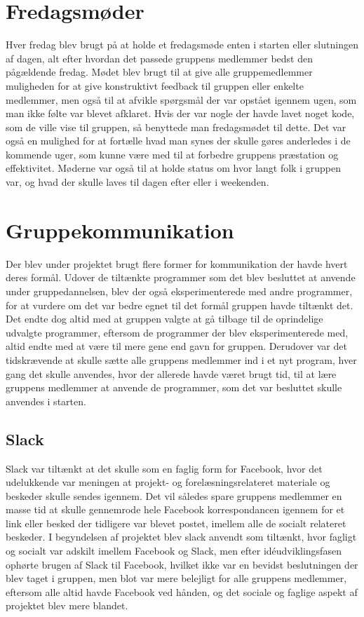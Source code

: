 \section{Fredagsmøder}\label{Fredagsmoeder}
Hver fredag blev brugt på at holde et fredagsmøde enten i starten eller slutningen af dagen, alt efter hvordan det passede gruppens medlemmer bedst den pågældende fredag. Mødet blev brugt til at give alle gruppemedlemmer muligheden for at give konstruktivt feedback til gruppen eller enkelte medlemmer, men også til at afvikle spørgsmål der var opstået igennem ugen, som man ikke følte var blevet afklaret. Hvis der var nogle der havde lavet noget kode, som de ville vise til gruppen, så benyttede man fredagsmødet til dette. Det var også en mulighed for at fortælle hvad man synes der skulle gøres anderledes i de kommende uger, som kunne være med til at forbedre gruppens præstation og effektivitet. Møderne var også til at holde status om hvor langt folk i gruppen var, og hvad der skulle laves til dagen efter eller i weekenden.

\section{Gruppekommunikation}\label{Gruppekommunikation}
Der blev under projektet brugt flere former for kommunikation der havde hvert deres formål. Udover de tiltænkte programmer som det blev besluttet at anvende under gruppedannelsen, blev der også eksperimenterede med andre programmer, for at vurdere om det var bedre egnet til det formål gruppen havde tiltænkt det. Det endte dog altid med at gruppen valgte at gå tilbage til de oprindelige udvalgte programmer, eftersom de programmer der blev eksperimenterede med, altid endte med at være til mere gene end gavn for gruppen. Derudover var det tidskrævende at skulle sætte alle gruppens medlemmer ind i et nyt program, hver gang det skulle anvendes, hvor der allerede havde været brugt tid, til at lære gruppens medlemmer at anvende de programmer, som det var besluttet skulle anvendes i starten.

\subsection{Slack}\label{Slack}
Slack var tiltænkt at det skulle som en faglig form for Facebook, hvor det udelukkende var meningen at projekt- og forelæsningsrelateret materiale og beskeder skulle sendes igennem. Det vil således spare gruppens medlemmer en masse tid at skulle gennemrode hele Facebook korrespondancen igennem for et link eller besked der tidligere var blevet postet, imellem alle de socialt relateret beskeder. I begyndelsen af projektet blev slack anvendt som tiltænkt, hvor fagligt og socialt var adskilt imellem Facebook og Slack, men efter idéudviklingsfasen ophørte brugen af Slack til Facebook, hvilket ikke var en bevidst beslutningen der blev taget i gruppen, men blot var mere belejligt for alle gruppens medlemmer, eftersom alle altid havde Facebook ved hånden, og det sociale og faglige aspekt af projektet blev mere blandet. 

